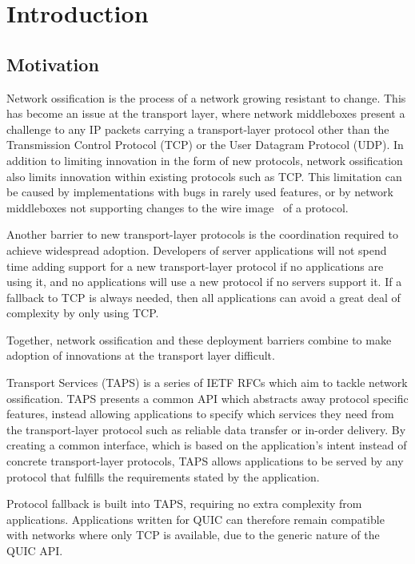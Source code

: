 \chapter{Introduction}\label{chap:intro}

\section{Motivation}\label{sec:motivation}
Network ossification is the process of a network growing
resistant to change.
This has become an issue at the transport layer, where
network middleboxes present a challenge to any IP
packets carrying a transport-layer protocol other than
the Transmission Control Protocol (TCP) or the User Datagram Protocol (UDP).
In addition to limiting innovation in
the form of new protocols, network ossification also limits
innovation within existing protocols such as TCP.
This limitation can be caused by implementations with bugs in rarely used features, or by network
middleboxes not supporting changes to the wire image~\cite{rfc8546} of a protocol.

Another barrier to new transport-layer protocols
is the coordination required to achieve widespread adoption.
Developers of server applications
will not spend time adding support for a new transport-layer protocol
if no applications are using it, and no applications
will use a new protocol if no servers support it.
If a fallback to TCP is always needed, then all applications
can avoid a great deal of complexity by only using TCP.

Together, network ossification and these deployment barriers
combine to make adoption of innovations at the transport layer difficult.

Transport Services (TAPS) is a series of IETF RFCs which aim
to tackle network ossification. TAPS presents
a common API which abstracts away protocol specific features, instead
allowing applications to specify which services they need from the
transport-layer protocol such as reliable data transfer or in-order delivery.
By creating a common interface, which is based on the application's
intent instead of concrete transport-layer protocols,
TAPS allows applications to be served by any
protocol that fulfills the requirements stated by the application.

Protocol fallback is built into TAPS,
requiring no extra complexity from applications. 
Applications written for QUIC can therefore remain compatible
with networks where only TCP is available, due to the
generic nature of the QUIC API.

